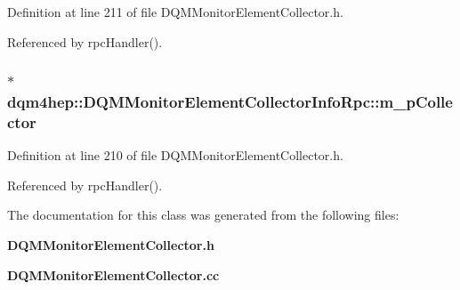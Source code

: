 Definition at line 211 of file D\+Q\+M\+Monitor\+Element\+Collector.\+h.



Referenced by rpc\+Handler().

\subsubsection[{m\+\_\+p\+Collector}]{$\ast$ dqm4hep\+::\+D\+Q\+M\+Monitor\+Element\+Collector\+Info\+Rpc\+::m\+\_\+p\+Collector\hspace{0.3cm}{\ttfamily [private]}}\label{classdqm4hep_1_1DQMMonitorElementCollectorInfoRpc_af95eb70b6cdcebb992c8056604c99d5e}


Definition at line 210 of file D\+Q\+M\+Monitor\+Element\+Collector.\+h.



Referenced by rpc\+Handler().



The documentation for this class was generated from the following files\+:\begin{DoxyCompactItemize}
\item 
{\bf D\+Q\+M\+Monitor\+Element\+Collector.\+h}\item 
{\bf D\+Q\+M\+Monitor\+Element\+Collector.\+cc}\end{DoxyCompactItemize}
